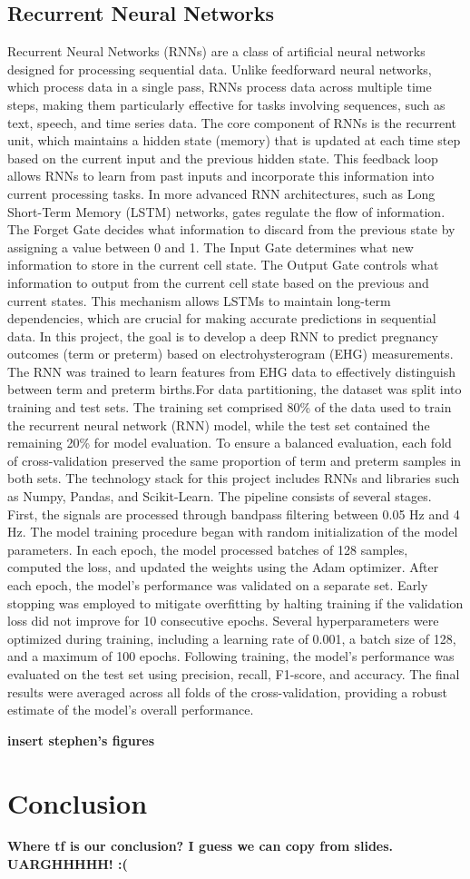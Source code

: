 \documentclass[conference]{IEEEtran}
\begin{document}
\subsection{Recurrent Neural Networks}
Recurrent Neural Networks (RNNs) are a class of artificial neural networks designed for processing sequential data. Unlike feedforward neural networks, which process data in a single pass, RNNs process data across multiple time steps, making them particularly effective for tasks involving sequences, such as text, speech, and time series data. The core component of RNNs is the recurrent unit, which maintains a hidden state (memory) that is updated at each time step based on the current input and the previous hidden state. This feedback loop allows RNNs to learn from past inputs and incorporate this information into current processing tasks.
In more advanced RNN architectures, such as Long Short-Term Memory (LSTM) networks, gates regulate the flow of information. The Forget Gate decides what information to discard from the previous state by assigning a value between 0 and 1. The Input Gate determines what new information to store in the current cell state. The Output Gate controls what information to output from the current cell state based on the previous and current states. This mechanism allows LSTMs to maintain long-term dependencies, which are crucial for making accurate predictions in sequential data.
In this project, the goal is to develop a deep RNN to predict pregnancy outcomes (term or preterm) based on electrohysterogram (EHG) measurements. The RNN was  trained to learn features from EHG data to effectively distinguish between term and preterm births.For data partitioning, the dataset was split into training and test sets. The training set comprised 80\% of the data used to train the recurrent neural network (RNN) model, while the test set contained the remaining 20\% for model evaluation. To ensure a balanced evaluation, each fold of cross-validation preserved the same proportion of term and preterm samples in both sets. The technology stack for this project includes RNNs and libraries such as Numpy, Pandas, and Scikit-Learn. The pipeline consists of several stages. First, the signals are processed through bandpass filtering between 0.05 Hz and 4 Hz. 
The model training procedure began with random initialization of the model parameters. In each epoch, the model processed batches of 128 samples, computed the loss, and updated the weights using the Adam optimizer. After each epoch, the model’s performance was validated on a separate set. Early stopping was employed to mitigate overfitting by halting training if the validation loss did not improve for 10 consecutive epochs.
Several hyperparameters were optimized during training, including a learning rate of 0.001, a batch size of 128, and a maximum of 100 epochs. Following training, the model's performance was evaluated on the test set using precision, recall, F1-score, and accuracy. The final results were averaged across all folds of the cross-validation, providing a robust estimate of the model's overall performance.

\textbf{insert stephen's figures}

\section{Conclusion}
\textbf{Where tf is our conclusion? I guess we can copy from slides. UARGHHHHH! :(}

\newpage\printbibliography
\end{document}
